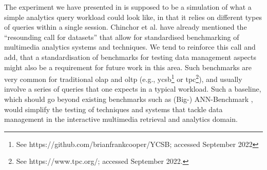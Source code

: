 The experiment we have presented in  is supposed to be a simulation of what a simple analytics query workload could look like, in that it relies on different types of queries within a single session. Chinchor et al. \cite{Chinchor:2010Multimedia} have already mentioned the ``resounding call for datasets'' that allow for standardised benchmarking of multimedia analytics systems and techniques. We tend to reinforce this call and add, that a standardisation of benchmarks for testing data management aspects might also be a requirement for future work in this area. Such benchmarks are very common for traditional \acrshort{olap} and \acrshort{oltp} (e.g., \acrshort{ycsb}\footnote{See https://github.com/brianfrankcooper/YCSB; accessed September 2022} or \acrshort{tpc}\footnote{See https://www.tpc.org/; accessed September 2022.}), and usually involve a series of queries that one expects in a typical workload. Such a baseline, which should go beyond existing benchmarks such as (Big-) ANN-Benchmark \cite{Aumueller:2017ANN,Simhadri:2022Results}, would simplify the testing of techniques and systems that tackle data management in the interactive multimedia retrieval and analytics domain.